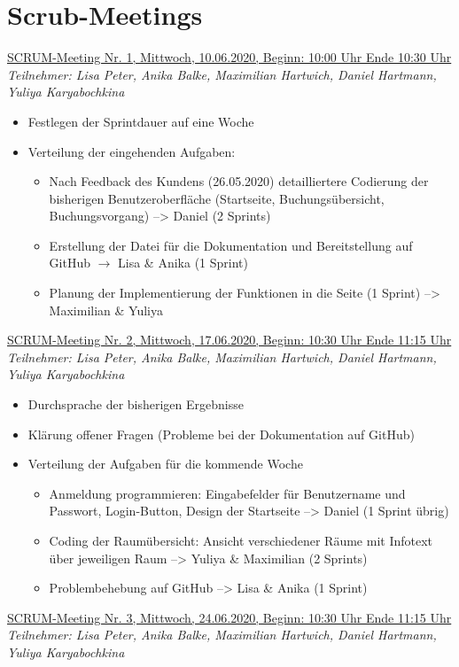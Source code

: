 \documentclass[a4paper,report,headsepline]{scrreprt}
\begin{document}
 
\section{Scrub-Meetings} 
 \underline{{\large SCRUM-Meeting Nr. 1, Mittwoch, 10.06.2020, Beginn: 10:00 Uhr Ende 10:30 Uhr}}  \\
\textit{Teilnehmer: Lisa Peter, Anika Balke, Maximilian Hartwich, Daniel Hartmann, Yuliya Karyabochkina}

\begin{itemize}
\item Festlegen der Sprintdauer auf eine Woche
\item Verteilung der eingehenden Aufgaben:
\begin{itemize}
\item Nach Feedback des Kundens (26.05.2020) detailliertere Codierung der bisherigen Benutzeroberfläche (Startseite, Buchungsübersicht, Buchungsvorgang) --> Daniel (2 Sprints)
\item Erstellung der Datei für die Dokumentation und Bereitstellung auf GitHub $\rightarrow$ Lisa \& Anika (1 Sprint)
\item Planung der Implementierung der Funktionen in die Seite (1 Sprint) --> Maximilian \& Yuliya 
\end{itemize}
\end{itemize}
 \underline{{\large SCRUM-Meeting Nr. 2, Mittwoch, 17.06.2020, Beginn: 10:30 Uhr Ende 11:15 Uhr}}  \\
\textit{Teilnehmer: Lisa Peter, Anika Balke, Maximilian Hartwich, Daniel Hartmann, Yuliya Karyabochkina}
      

\begin{itemize}
\item Durchsprache der bisherigen Ergebnisse
\item Klärung offener Fragen (Probleme bei der Dokumentation auf GitHub)
\item Verteilung der Aufgaben für die kommende Woche
\begin{itemize}
\item Anmeldung programmieren: Eingabefelder für Benutzername und Passwort, Login-Button, Design der Startseite --> Daniel (1 Sprint übrig)
\item Coding der Raumübersicht: Ansicht verschiedener Räume mit Infotext über jeweiligen Raum --> Yuliya \& Maximilian (2 Sprints)
\item Problembehebung auf GitHub --> Lisa \& Anika (1 Sprint)

\end{itemize}
\end{itemize}
 \underline{{\large SCRUM-Meeting Nr. 3, Mittwoch, 24.06.2020, Beginn: 10:30 Uhr Ende 11:15 Uhr}}  \\
\textit{Teilnehmer: Lisa Peter, Anika Balke, Maximilian Hartwich, Daniel Hartmann, Yuliya Karyabochkina}      
\end{document}

